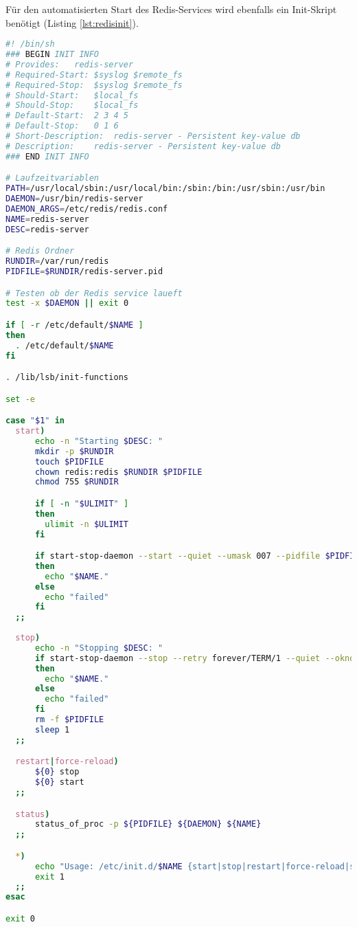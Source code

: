 Für den automatisierten Start des Redis-Services wird ebenfalls ein Init-Skript benötigt (Listing \ref{lst:redisinit}).

\begin{lstlisting}[language=Bash, caption=Redis Server Service, label={lst:redisinit}]
#! /bin/sh
### BEGIN INIT INFO
# Provides:   redis-server
# Required-Start: $syslog $remote_fs
# Required-Stop:  $syslog $remote_fs
# Should-Start:   $local_fs
# Should-Stop:    $local_fs
# Default-Start:  2 3 4 5
# Default-Stop:   0 1 6
# Short-Description:  redis-server - Persistent key-value db
# Description:    redis-server - Persistent key-value db
### END INIT INFO

# Laufzeitvariablen
PATH=/usr/local/sbin:/usr/local/bin:/sbin:/bin:/usr/sbin:/usr/bin
DAEMON=/usr/bin/redis-server
DAEMON_ARGS=/etc/redis/redis.conf
NAME=redis-server
DESC=redis-server

# Redis Ordner
RUNDIR=/var/run/redis
PIDFILE=$RUNDIR/redis-server.pid

# Testen ob der Redis service laueft
test -x $DAEMON || exit 0

if [ -r /etc/default/$NAME ]
then
  . /etc/default/$NAME
fi

. /lib/lsb/init-functions

set -e

case "$1" in
  start)
      echo -n "Starting $DESC: "
      mkdir -p $RUNDIR
      touch $PIDFILE
      chown redis:redis $RUNDIR $PIDFILE
      chmod 755 $RUNDIR

      if [ -n "$ULIMIT" ]
      then
        ulimit -n $ULIMIT
      fi

      if start-stop-daemon --start --quiet --umask 007 --pidfile $PIDFILE --chuid redis:redis --exec $DAEMON -- $DAEMON_ARGS
      then
        echo "$NAME."
      else
        echo "failed"
      fi
  ;;
  
  stop)
      echo -n "Stopping $DESC: "
      if start-stop-daemon --stop --retry forever/TERM/1 --quiet --oknodo --pidfile $PIDFILE --exec $DAEMON
      then
        echo "$NAME."
      else
        echo "failed"
      fi
      rm -f $PIDFILE
      sleep 1
  ;;

  restart|force-reload)
      ${0} stop
      ${0} start
  ;;

  status)
      status_of_proc -p ${PIDFILE} ${DAEMON} ${NAME}
  ;;

  *)
      echo "Usage: /etc/init.d/$NAME {start|stop|restart|force-reload|status}" >&2
      exit 1
  ;;
esac

exit 0
\end{lstlisting}